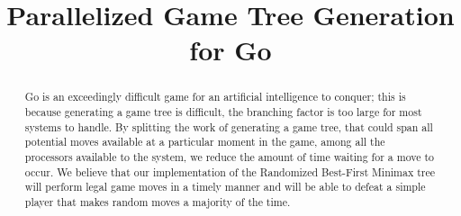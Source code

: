 \documentclass[conference]{IEEEtran}
\begin{document}
\title{Parallelized Game Tree Generation\\for Go}


\author{
}

\maketitle


\begin{abstract}
Go is an exceedingly difficult game for an artificial intelligence to conquer; this is because generating a game tree is difficult, the branching factor is too large for most systems to handle. By splitting the work of generating a game tree, that could span all potential moves available at a particular moment in the game, among all the processors available to the system, we reduce the amount of time waiting for a move to occur. We believe that our implementation of the Randomized Best-First Minimax tree will perform legal game moves in a timely manner and will be able to defeat a simple player that makes random moves a majority of the time.
\end{abstract}
\end{document}
